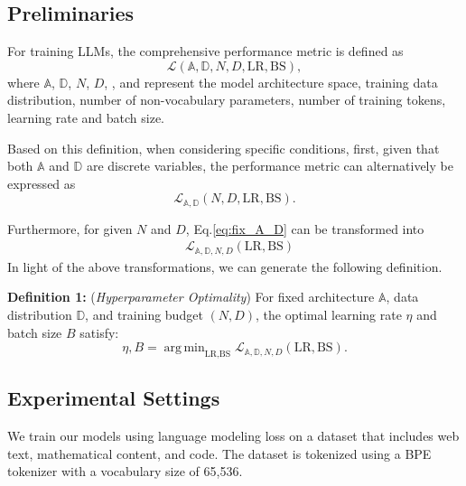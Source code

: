 \documentclass[11pt]{article}
\begin{document}
    \subsection{Preliminaries}
    \label{preliminaries} For training LLMs, the comprehensive performance
    metric is defined as
    \begin{equation}
        \mathcal{L}(\mathbb{A}, \mathbb{D}, N, D, \text{LR}, \text{BS}),
    \end{equation}
    where $\mathbb{A}$, $\mathbb{D}$, $N$, $D$, , and  represent
    the model architecture space, training data distribution, number of non-vocabulary
        parameters, number of training tokens, learning rate and batch size.

    Based on this definition, when considering specific conditions, first, given
    that both $\mathbb{A}$ and $\mathbb{D}$ are discrete variables, the performance
    metric can alternatively be expressed as
    \begin{equation}
        \mathcal{L}_{\mathbb{A},\mathbb{D}}(N, D, \text{LR}, \text{BS}). \label{eq:fix_A_D}
    \end{equation}

    Furthermore, for given $N$ and $D$, Eq.\eqref{eq:fix_A_D} can be transformed
    into
    \begin{equation}
        \begin{aligned}
             & \mathcal{L}_{\mathbb{A}, \mathbb{D}, N, D}(\text{LR}, \text{BS})
        \end{aligned}
    \end{equation}
    In light of the above transformations, we can generate the following
    definition.

    \textbf{Definition 1: }\label{defin:1} (\emph{Hyperparameter Optimality}) For fixed
    architecture $\mathbb{A}$, data distribution $\mathbb{D}$, and training
    budget $(N, D)$, the optimal learning rate $\eta$ and batch size $B$ satisfy:
    \begin{equation}
        \eta, B = \mathop{\mathrm{arg\,min}}_{\text{LR}, \text{BS}}\mathcal{L}_{\mathbb{A},\mathbb{D},N,D}
        (\text{LR}, \text{BS}).
    \end{equation}

    \subsection{Experimental Settings}
    \label{exp_set}
    We train our models using language modeling
    loss on a dataset that includes web text, mathematical content, and code. The
    dataset is tokenized using a BPE \cite{Gage1994ANA} tokenizer with a vocabulary size of 65,536.
\end{document}
